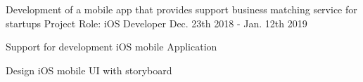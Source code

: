 \begin{cventries}
  \cventry
    {Development of a mobile app that provides support business matching service for startups} %
    {Project} %
    {Role: iOS Developer} %
    {Dec. 23th 2018 - Jan. 12th 2019} %
    {
      \begin{cvitems} %
        \item {Support for development iOS mobile Application}
        \item {Design iOS mobile UI with storyboard}
      \end{cvitems}
    }


\end{cventries}
